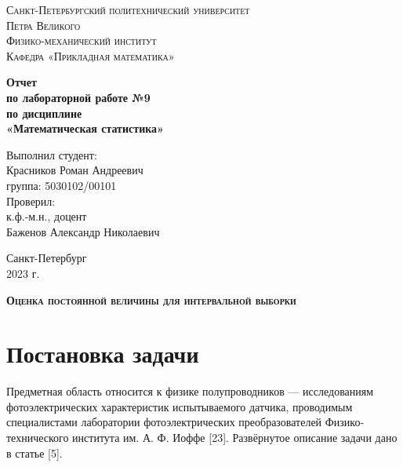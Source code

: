 \documentclass[12pt]{article}
\begin{document}
	\begin{titlepage}
		\begin{center}
			\textsc{Санкт-Петербургский политехнический университет\\Петра Великого\\[5mm]
				Физико-механический институт\\[2mm]
				Кафедра «Прикладная математика»}
			
			\vfill
			
			\textbf{Отчет\\по лабораторной работе №9\\по дисциплине\\«Математическая статистика»
				\\[26mm]
			}
		\end{center}
		
		\noindent
		\hspace*{100mm} Выполнил студент:\\[3mm]
		\hspace*{100mm} Красников Роман Андреевич\\
		\hspace*{100mm} группа: 5030102/00101\\[10mm]
		\hspace*{100mm} Проверил:\\[3mm]
		\hspace*{100mm} к.ф.-м.н., доцент\\
		\hspace*{100mm} Баженов Александр Николаевич
		
		\vspace*{\fill}
		\begin{center}
			Санкт-Петербург\\2023 г.
		\end{center}
	\end{titlepage}
	
	\newpage
	\tableofcontents
	\newpage
	\listoffigures
	\newpage
	\listoftables
	\newpage
	
	\textsc{\textbf{\large{Оценка постоянной величины для интервальной выборки}}}\\
	\section{Постановка задачи}
	Предметная область относится к физике полупроводников — исследованиям фотоэлектрических характеристик испытываемого датчика, проводимым специалистами лаборатории фотоэлектрических преобразователей Физико-технического института им. А. Ф. Иоффе [23].
	Развёрнутое описание задачи дано в статье [5].
	
\end{document}

